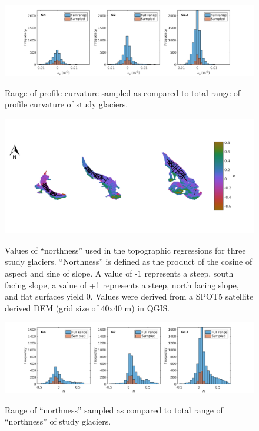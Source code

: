 \documentclass[12pt]{article}
\begin{document}
\begin{landscape}
\begin{figure}
	\centering
	\includegraphics[height = 0.4\textwidth]{SampledRangeTopo_profileCurve.png}\\
	\caption{Range of profile curvature sampled as compared to total range of profile curvature of study glaciers.}
	\label{sampledRange:profileC}
\end{figure}


\begin{figure}
	\centering
	\includegraphics[height = 0.36\textwidth]{Map_northness.png}\\
	\caption{Values of ``northness'' used in the topographic regressions for three study glaciers. ``Northness'' is defined as the product of the cosine of aspect and sine of slope. A value of -1 represents a steep, south facing slope, a value of +1 represents a steep, north facing slope, and flat surfaces yield 0. Values were derived from a SPOT5 satellite derived DEM (grid size of 40x40 m) in QGIS.}
	\label{map:northness}
\end{figure}

\begin{figure}
	\centering
	\includegraphics[height = 0.4\textwidth]{SampledRangeTopo_northness.png}\\
	\caption{Range of ``northness'' sampled as compared to total range of ``northness'' of study glaciers.}
	\label{sampledRange:northness}
\end{figure}


\end{landscape}
\end{document}

